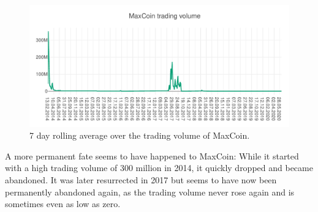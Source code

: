 \documentclass[11pt,a4paper,compsoc,conference]{IEEEtran}
\begin{document}
\begin{figure}[ht]
    \centering
    \includegraphics[width=\linewidth]{figures/diagram-20200614 (3).pdf}
    \caption[Trading Volume of MaxCoin]{7 day rolling average over the trading volume of MaxCoin.}
    \label{fig:tradingvolmaxcoin}
\end{figure}

A more permanent fate seems to have happened to MaxCoin: While it started with a high trading volume of 300 million in 2014, it quickly dropped and became abandoned. It was later resurrected in 2017 but seems to have now been permanently abandoned again, as the trading volume never rose again and is sometimes even as low as zero.
\end{document}
